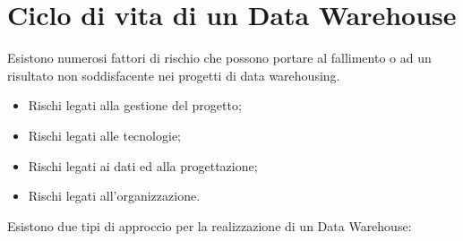 \section{Ciclo di vita di un Data Warehouse}
Esistono numerosi fattori di rischio che possono portare al fallimento o ad un risultato non soddisfacente nei progetti di data warehousing.
\begin{itemize}
	\item Rischi legati alla gestione del progetto;
	\item Rischi legati alle tecnologie;
	\item Rischi legati ai dati ed alla progettazione;
	\item Rischi legati all'organizzazione.
\end{itemize}
Esistono due tipi di approccio per la realizzazione di un Data Warehouse:
